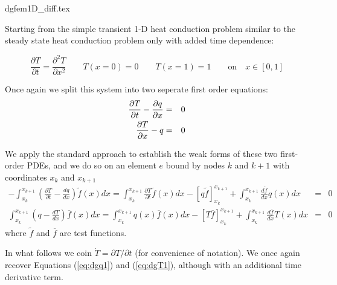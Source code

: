 \begin{flushright} {\tiny {\color{gray} dgfem1D\_diff.tex}} \end{flushright}

Starting from the simple transient 1-D heat conduction problem similar to the 
steady state heat conduction problem only with added time dependence:

\begin{equation}
\frac{\partial T}{\partial t}=\frac{\partial^2T}{\partial x^2} \qquad T(x=0)=0 \qquad T(x=1)=1 \qquad \text{on} \quad x\in[0,1]
\end{equation}

Once again we split this system into two seperate first order equations:
\begin{eqnarray}
\frac{\partial T}{\partial t}-\frac{\partial q}{\partial x}&=&0 \nonumber\\
\frac{\partial T}{\partial x} -q &=& 0
\end{eqnarray}

We apply the standard approach to establish the weak forms of these two first-order PDEs, and we do so 
on an element $e$ bound by nodes $k$ and $k+1$ with coordinates $x_k$ and $x_{k+1}$
\begin{eqnarray}
-\int_{x_k}^{x_{k+1}} \left( \frac{\partial T}{\partial t}- \frac{dq}{dx} \right) \tilde{f}(x) dx =
\int_{x_k}^{x_{k+1}} \frac{\partial T}{\partial t} \tilde{f}(x)dx
 -\left[q \tilde{f} \right]_{x_k}^{x_{k+1}} 
+ \int_{x_k}^{x_{k+1}} \frac{d\tilde{f}}{dx} q(x) dx &=& 0
\label{eq:dg1a}\\
\int_{x_k}^{x_{k+1}}  \left( q-\frac{dT}{dx} \right) \overline{f}(x) dx
=
\int_{x_k}^{x_{k+1}}  q(x) \overline{f}(x) dx
-\left[ T \overline{f}  \right]_{x_k}^{x_{k+1}} + \int_{x_k}^{x_{k+1}} \frac{d\overline{f}}{dx} T(x) dx 
&=& 0
\label{eq:dg2a}
\end{eqnarray}
where $\tilde{f}$ and $\overline{f}$ are test functions.

In what follows we coin $\dot{T}=\partial T/\partial t$ (for convenience of notation). 
We once again recover Equations (\ref{eq:dgq1}) and (\ref{eq:dgT1}), although with 
an additional time derivative term. 

